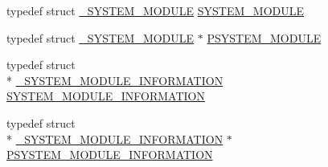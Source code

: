 \begin{DoxyCompactItemize}
\item 
typedef struct \hyperlink{struct___s_y_s_t_e_m___m_o_d_u_l_e}{\-\_\-\-S\-Y\-S\-T\-E\-M\-\_\-\-M\-O\-D\-U\-L\-E} \hyperlink{ntquerysysteminformation_8h_ab40017ed4fa44d862a300868be40315b}{S\-Y\-S\-T\-E\-M\-\_\-\-M\-O\-D\-U\-L\-E}
\item 
typedef struct \hyperlink{struct___s_y_s_t_e_m___m_o_d_u_l_e}{\-\_\-\-S\-Y\-S\-T\-E\-M\-\_\-\-M\-O\-D\-U\-L\-E} $\ast$ \hyperlink{ntquerysysteminformation_8h_a287076c5392d02b8fc045ebe71c9e56c}{P\-S\-Y\-S\-T\-E\-M\-\_\-\-M\-O\-D\-U\-L\-E}
\item 
typedef struct \\*
\hyperlink{struct___s_y_s_t_e_m___m_o_d_u_l_e___i_n_f_o_r_m_a_t_i_o_n}{\-\_\-\-S\-Y\-S\-T\-E\-M\-\_\-\-M\-O\-D\-U\-L\-E\-\_\-\-I\-N\-F\-O\-R\-M\-A\-T\-I\-O\-N} \hyperlink{ntquerysysteminformation_8h_aab9e13324a27a016ba9480224ab7d625}{S\-Y\-S\-T\-E\-M\-\_\-\-M\-O\-D\-U\-L\-E\-\_\-\-I\-N\-F\-O\-R\-M\-A\-T\-I\-O\-N}
\item 
typedef struct \\*
\hyperlink{struct___s_y_s_t_e_m___m_o_d_u_l_e___i_n_f_o_r_m_a_t_i_o_n}{\-\_\-\-S\-Y\-S\-T\-E\-M\-\_\-\-M\-O\-D\-U\-L\-E\-\_\-\-I\-N\-F\-O\-R\-M\-A\-T\-I\-O\-N} $\ast$ \hyperlink{ntquerysysteminformation_8h_a27e9ba777645ba1eb60bcfb12c245d02}{P\-S\-Y\-S\-T\-E\-M\-\_\-\-M\-O\-D\-U\-L\-E\-\_\-\-I\-N\-F\-O\-R\-M\-A\-T\-I\-O\-N}
\end{DoxyCompactItemize}
